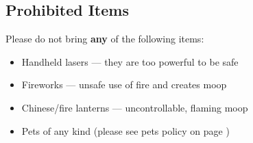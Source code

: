 \subsection*{Prohibited Items} %
Please do not bring \textbf{any} of the following items:

\begin{multicols}{2}
\begin{itemize}[noitemsep]
	\item Handheld lasers --- they are too powerful to be safe
    \item Fireworks --- unsafe use of fire and creates \gls{moop}
    \item Chinese/fire lanterns --- uncontrollable, flaming \gls{moop} 
    \item Pets of any kind (please see pets policy on page \pageref{sub:nopets})
\end{itemize}
\end{multicols}





